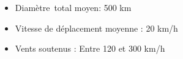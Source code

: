 \documentclass[aspectratio=169, usepdftitle=false, xcolor={dvipsnames}, 9pt,table]{beamer}
\begin{document}
\begin{frame}[t]
\begin{columns}
\begin{column}{0.5\textwidth}
\begin{block}
\begin{itemize}
                    \item Diamètre\footnotemark~total moyen: 500 km \parencite{carrasco_influence_2014}
                    \item Vitesse de déplacement moyenne : 20 km/h
                    \item Vents soutenus : Entre 120 et 300 km/h
                \end{itemize}
            \end{block}
        \end{column}
    \end{columns}
    \renewcommand*{\thefootnote}{\arabic{footnote}}
    \setcounter{footnote}{0}
\end{frame}
\end{document}
